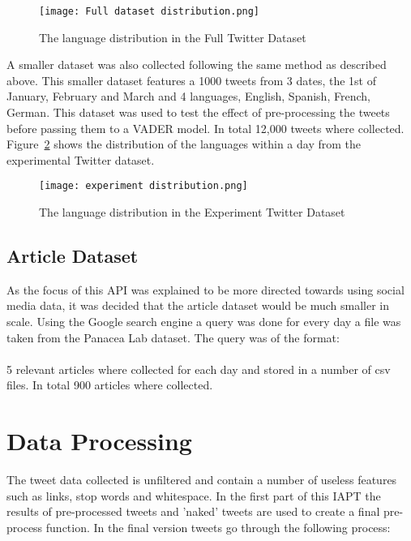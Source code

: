 \begin{figure}[h!]
    \centering
    \texttt{[image: Full dataset distribution.png]}
    \caption{The language distribution in the Full Twitter Dataset}\label{fig:fulldatda}
\end{figure}

A smaller dataset was also collected following the same method as described above.
This smaller dataset features a 1000 tweets from 3 dates, the 1st of January, February and March and 4 languages, English, Spanish, French, German.
This dataset was used to test the effect of pre-processing the tweets before passing them to a \ac{VADER} model.
In total 12,000 tweets where collected.
Figure~\ref{fig:experiment} shows the distribution of the languages within a day from the experimental Twitter dataset.

\begin{figure}[h!]
    \centering
    \texttt{[image: experiment distribution.png]}
    \caption{The language distribution in the Experiment Twitter Dataset}\label{fig:experiment}
\end{figure}

\subsection{Article Dataset}

As the focus of this \ac{API} was explained to be more directed towards using social media data, it was decided that the article dataset would be much smaller in scale.
Using the Google search engine a query was done for every day a file was taken from the Panacea Lab dataset.
The query was of the format: \\\\
5 relevant articles where collected for each day and stored in a number of csv files.
In total 900 articles where collected.

\section{Data Processing}

The tweet data collected is unfiltered and contain a number of useless features such as links, stop words and whitespace.
In the first part of this \ac{IAPT} the results of pre-processed tweets and 'naked' tweets are used to create a final pre-process function.
In the final version tweets go through the following process:

